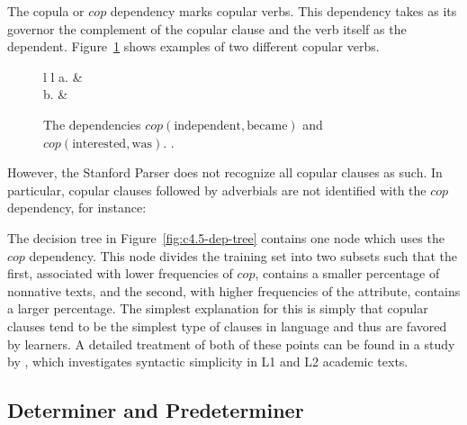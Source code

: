 \documentclass[main.tex]{subfiles}
\begin{document}
The copula or $cop$ dependency marks copular verbs. This dependency takes as its governor the complement of the copular clause and the verb itself as the dependent. Figure~\ref{ex:cop1} shows examples of two different copular verbs.
\begin{figure}[ht]
\centering
\begin{tabular}{ l l }
a. &
\\

b. &
\\
\end{tabular}
\caption{The dependencies $cop(\text{independent},\text{became})$ and $cop(\text{interested},\text{was})$. \citep[Ch. 2.15, 2.16]{quirk:1985}.}
\label{ex:cop1}
\end{figure}
However, the Stanford Parser does not recognize all copular clauses as such. In particular, copular clauses followed by adverbials are not identified with the $cop$ dependency, for instance:

The decision tree in Figure~\ref{fig:c4.5-dep-tree} contains one node which uses the $cop$ dependency. This node divides the training set into two subsets such that the first, associated with lower frequencies of $cop$, contains a smaller percentage of nonnative texts, and the second, with higher frequencies of the attribute, contains a larger percentage. The simplest explanation for this is simply that copular clauses tend to be the simplest type of clauses in language and thus are favored by learners. A detailed treatment of both of these points can be found in a study by \citet{hinkel:2003}, which investigates syntactic simplicity in L1 and L2 academic texts.

\subsection{Determiner and Predeterminer}
\end{document}
